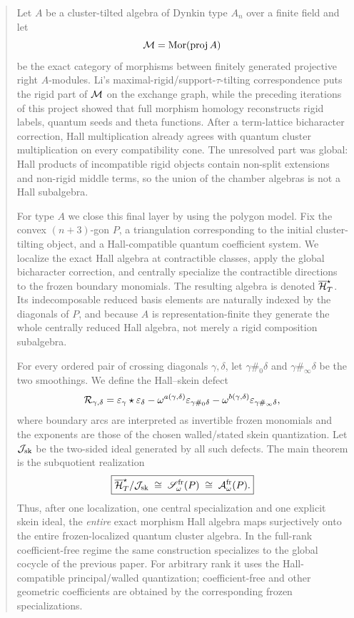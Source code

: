 \begin{abstract}
Let $A$ be a cluster-tilted algebra of Dynkin type $A_n$ over a finite
field and let
\[
 \MM=\Mor(\proj A)
\]
be the exact category of morphisms between finitely generated projective
right $A$-modules.  Li's maximal-rigid/support-$\tau$-tilting correspondence
puts the rigid part of $\MM$ on the exchange graph, while the preceding
iterations of this project showed that full morphism homology reconstructs
rigid labels, quantum seeds and theta functions.  After a term-lattice
bicharacter correction, Hall multiplication already agrees with quantum
cluster multiplication on every compatibility cone.  The unresolved part was
global: Hall products of incompatible rigid objects contain non-split
extensions and non-rigid middle terms, so the union of the chamber algebras is
not a Hall subalgebra.

For type $A$ we close this final layer by using the polygon model.  Fix the
convex $(n+3)$-gon $P$, a triangulation corresponding to the initial
cluster-tilting object, and a Hall-compatible quantum coefficient system.  We
localize the exact Hall algebra at contractible classes, apply the global
bicharacter correction, and centrally specialize the contractible directions
to the frozen boundary monomials.  The resulting algebra is denoted
$\Hred$.  Its indecomposable reduced basis elements are naturally indexed by
the diagonals of $P$, and because $A$ is representation-finite they generate
the whole centrally reduced Hall algebra, not merely a rigid composition
subalgebra.

For every ordered pair of crossing diagonals $\gamma,\delta$, let
$\gamma\#_0\delta$ and $\gamma\#_\infty\delta$ be the two smoothings.  We
define the Hall--skein defect
\[
 \mathcal R_{\gamma,\delta}
 =\eps_\gamma\star\eps_\delta
  -\omega^{a(\gamma,\delta)}\eps_{\gamma\#_0\delta}
  -\omega^{b(\gamma,\delta)}\eps_{\gamma\#_\infty\delta},
\]
where boundary arcs are interpreted as invertible frozen monomials and the
exponents are those of the chosen walled/stated skein quantization.  Let
$\Jsk$ be the two-sided ideal generated by all such defects.  The main theorem
is the subquotient realization
\[
 \boxed{
  \Hred/\Jsk\;\cong\;
  \Skein_\omega^{\rm fr}(P)
  \;\cong\;
  \mathcal A_\omega^{\rm fr}(P).
 }
\]
Thus, after one localization, one central specialization and one explicit
skein ideal, the \emph{entire} exact morphism Hall algebra maps
surjectively onto the entire frozen-localized quantum cluster algebra.  In the
full-rank coefficient-free regime the same construction specializes to the
global cocycle of the previous paper.  For arbitrary rank it uses the
Hall-compatible principal/walled quantization; coefficient-free and other
geometric coefficients are obtained by the corresponding frozen
specializations.


\end{abstract}
